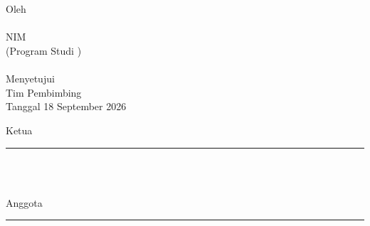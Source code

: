 \chapter*{\MakeUppercase{\thesistitle}}
\centering

Oleh \\
\textbf{\authorname} \\
NIM \textbf{\authornim} \\
(Program Studi \major) \\[0.5cm]

\university \\[1cm]

Menyetujui \\
Tim Pembimbing \\
Tanggal 18 September 2026\\[1cm]


\begingroup
{}

\noindent
\begin{minipage}[t]{0.45\textwidth}
    \centering

    Ketua

    \vspace{43.2pt}

    \rule{5.5cm}{0.4pt} \\[0.2cm]

    \dospemsatu \\

\end{minipage}
\hfill
\begin{minipage}[t]{0.45\textwidth}
    \centering

    Anggota

    \vspace{43.2pt}

    \rule{5.5cm}{0.4pt} \\[0.2cm]

    \dospemdua \\

\end{minipage}

\endgroup
